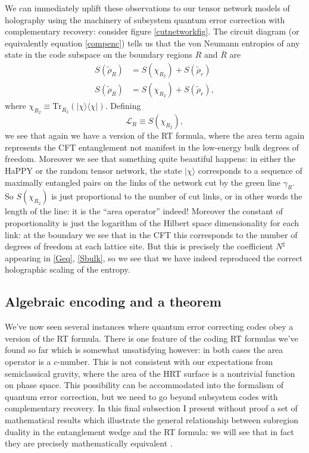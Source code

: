 \documentclass[toc]{PoS}
\newcommand{\be}{\begin{equation}}
\newcommand{\ee}{\end{equation}}
\newcommand{\lan}{\langle}
\newcommand{\ran}{\rangle}
\newcommand{\Tr}{\mathrm{Tr}}
\newcommand{\wt}{\widetilde}
\newcommand{\LR}{\mathcal{L}_R}
\newcommand{\ol}{\overline}
\begin{document}
We can immediately uplift these observations to our tensor network models of holography using the machinery of subsystem quantum error correction with complementary recovery: consider figure \ref{cutnetworkfig}. The circuit diagram (or equivalently equation \eqref{compenc}) tells us that the von Neumann entropies of any state in the code subspace on the boundary regions $R$ and $\ol{R}$ are
\begin{align}\nonumber
S(\wt{\rho}_R)&=S(\chi_{R_2})+S(\wt{\rho}_r)\\
S(\wt{\rho}_{\ol{R}})&=S(\chi_{R_2})+S(\wt{\rho}_{\ol{r}}),
\end{align}
where $\chi_{R_2}\equiv\Tr_{\ol{R}_2}\left(|\chi\ran\lan\chi|\right)$.  Defining
\be\label{LR2}
\LR\equiv S(\chi_{R_2}),
\ee
we see that again we have a version of the RT formula, where the area term again represents the CFT entanglement not manifest in the low-energy bulk degrees of freedom.  Moreover we see that something quite beautiful happens: in either the HaPPY or the random tensor network, the state $|\chi\ran$ corresponds to a sequence of maximally entangled pairs on the links of the network cut by the green line $\gamma_R$.  So $S(\chi_{R_2})$ is just proportional to the number of cut links, or in other words the length of the line: it is the ``area operator'' indeed!  Moreover the constant of proportionality is just the logarithm of the Hilbert space dimensionality for each link: at the boundary we see that in the CFT this corresponds to the number of degrees of freedom at each lattice site.  But this is precisely the coefficient $N^\sharp$ appearing in \eqref{Geq}, \eqref{Sbulk}, so we see that we have indeed reproduced the correct holographic scaling of the entropy.

\subsection{Algebraic encoding and a theorem}
We've now seen several instances where quantum error correcting codes obey a version of the RT formula.  There is one feature of the coding RT formulas we've found so far which is somewhat unsatisfying however: in both cases the area operator is a $c$-number.  This is not consistent with our expectations from semiclassical gravity, where the area of the HRT surface is a nontrivial function on phase space.  This possibility can be accommodated into the formalism of quantum error correction, but we need to go beyond subsystem codes with complementary recovery.  In this final subsection I present without proof a set of mathematical results which illustrate the general relationship between subregion duality in the entanglement wedge and the RT formula: we will see that in fact they are precisely mathematically equivalent \cite{Harlow:2016vwg}.
\end{document}
